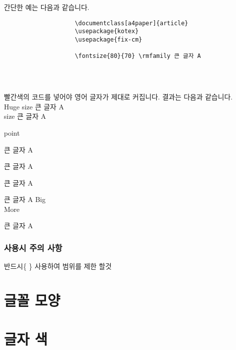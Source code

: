 			간단한 예는 다음과 같습니다.\\
			
			\begin{boxedminipage}[c]{1.0\linewidth}
				\begin{verbatim}
					\documentclass[a4paper]{article}
					\usepackage{kotex}
					\usepackage{fix-cm}
					
					\fontsize{80}{70} \rmfamily 큰 글자 A
					
				\end{verbatim}
			\end{boxedminipage}\\
			\doublespace
			
			빨간색의 코드를 넣어야 영어 글자가 제대로 커집니다. 결과는 다음과 같습니다.		\\
			{\Huge Huge size 큰 글자 A}\\
			{\fontsize{70}{70}  size 큰 글자 A}
					
			\newpage
			{\fontsize{20}{20}   point \par}
			큰 글자 A \par
			{\fontsize{30}{35} \rmfamily 큰 글자 A \par}
			큰 글자 A \par
			{\fontsize{30}{35} \selectfont 큰 글자 A Big\\ More \par}	
			큰 글자 A \par
			\doublespace
																														\subsection*{사용시 주의 사항}
																														반드시\{ \} 사용하여 범위를 제한 할것
																																
																																		
																																				
\newpage  
\chapter{글꼴 모양}


\newpage  
\chapter{글자 색}

	

